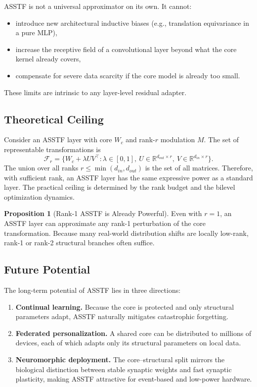 \documentclass[11pt,a4paper]{article}
\theoremstyle{definition}
\newtheorem{proposition}{Proposition}[section]
\begin{document}
ASSTF is not a universal approximator on its own. It cannot:
\begin{itemize}
    \item introduce new architectural inductive biases (e.g., translation equivariance in a pure MLP),
    \item increase the receptive field of a convolutional layer beyond what the core kernel already covers,
    \item compensate for severe data scarcity if the core model is already too small.
\end{itemize}
These limits are intrinsic to any layer-level residual adapter.

\subsection{Theoretical Ceiling}
\label{subsec:ceiling}

Consider an ASSTF layer with core $W_c$ and rank-$r$ modulation $M$. The set of representable transformations is
\begin{equation}
    \mathcal{F}_r = \{ W_c + \lambda U V^{\top} : \lambda \in [0,1],\ U \in \mathbb{R}^{d_{out}\times r},\ V \in \mathbb{R}^{d_{in}\times r} \}.
\end{equation}
The union over all ranks $r \le \min(d_{in}, d_{out})$ is the set of all matrices. Therefore, with sufficient rank, an ASSTF layer has the same expressive power as a standard layer. The practical ceiling is determined by the rank budget and the bilevel optimization dynamics.

\begin{proposition}[Rank-1 ASSTF is Already Powerful]
    \label{prop:rank1}
    Even with $r=1$, an ASSTF layer can approximate any rank-1 perturbation of the core transformation. Because many real-world distribution shifts are locally low-rank, rank-1 or rank-2 structural branches often suffice.
\end{proposition}

\subsection{Future Potential}
\label{subsec:potential}

The long-term potential of ASSTF lies in three directions:
\begin{enumerate}
    \item \textbf{Continual learning.} Because the core is protected and only structural parameters adapt, ASSTF naturally mitigates catastrophic forgetting.
    \item \textbf{Federated personalization.} A shared core can be distributed to millions of devices, each of which adapts only its structural parameters on local data.
    \item \textbf{Neuromorphic deployment.} The core--structural split mirrors the biological distinction between stable synaptic weights and fast synaptic plasticity, making ASSTF attractive for event-based and low-power hardware.
\end{enumerate}
\end{document}
